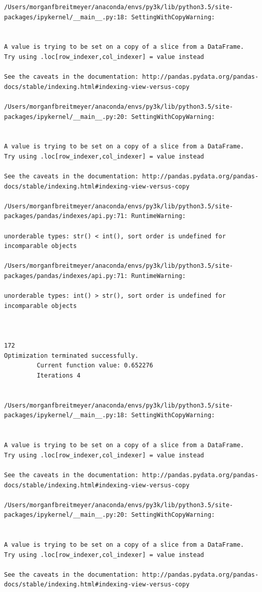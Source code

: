 \begin{lstlisting}
/Users/morganfbreitmeyer/anaconda/envs/py3k/lib/python3.5/site-packages/ipykernel/__main__.py:18: SettingWithCopyWarning:


A value is trying to be set on a copy of a slice from a DataFrame.
Try using .loc[row_indexer,col_indexer] = value instead

See the caveats in the documentation: http://pandas.pydata.org/pandas-docs/stable/indexing.html#indexing-view-versus-copy

/Users/morganfbreitmeyer/anaconda/envs/py3k/lib/python3.5/site-packages/ipykernel/__main__.py:20: SettingWithCopyWarning:


A value is trying to be set on a copy of a slice from a DataFrame.
Try using .loc[row_indexer,col_indexer] = value instead

See the caveats in the documentation: http://pandas.pydata.org/pandas-docs/stable/indexing.html#indexing-view-versus-copy

/Users/morganfbreitmeyer/anaconda/envs/py3k/lib/python3.5/site-packages/pandas/indexes/api.py:71: RuntimeWarning:

unorderable types: str() < int(), sort order is undefined for incomparable objects

/Users/morganfbreitmeyer/anaconda/envs/py3k/lib/python3.5/site-packages/pandas/indexes/api.py:71: RuntimeWarning:

unorderable types: int() > str(), sort order is undefined for incomparable objects



172
Optimization terminated successfully.
         Current function value: 0.652276
         Iterations 4


/Users/morganfbreitmeyer/anaconda/envs/py3k/lib/python3.5/site-packages/ipykernel/__main__.py:18: SettingWithCopyWarning:


A value is trying to be set on a copy of a slice from a DataFrame.
Try using .loc[row_indexer,col_indexer] = value instead

See the caveats in the documentation: http://pandas.pydata.org/pandas-docs/stable/indexing.html#indexing-view-versus-copy

/Users/morganfbreitmeyer/anaconda/envs/py3k/lib/python3.5/site-packages/ipykernel/__main__.py:20: SettingWithCopyWarning:


A value is trying to be set on a copy of a slice from a DataFrame.
Try using .loc[row_indexer,col_indexer] = value instead

See the caveats in the documentation: http://pandas.pydata.org/pandas-docs/stable/indexing.html#indexing-view-versus-copy


\end{lstlisting}
